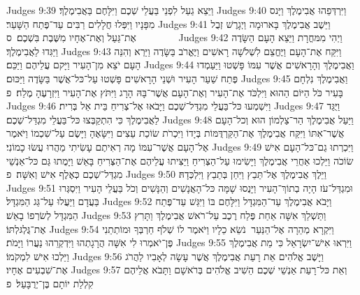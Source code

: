 Judges 9:39	וַיֵּצֵא גַעַל לִפְנֵי בַּעֲלֵי שְׁכֶם וַיִּלָּחֶם בַּאֲבִימֶלֶךְ׃
Judges 9:40	וַיִּרְדְּפֵהוּ אֲבִימֶלֶךְ וַיָּנס מִפָּנָיו וַיִּפְּלוּ חֲלָלִים רַבִּים עַד־פֶּתַח הַשָּׁעַר׃
Judges 9:41	וַיֵּשֶׁב אֲבִימֶלֶךְ בָּארוּמָה וַיְגָרֶשׁ זְבֻל אֶת־גַּעַל וְאֶת־אֶחָיו מִשֶּׁבֶת בִּשְׁכֶם׃ {ס}        
Judges 9:42	וַיְהִי מִמּחֳרָת וַיֵּצֵא הָעָם הַשָּׂדֶה וַיַּגִּדוּ לַאֲבִימֶלֶךְ׃
Judges 9:43	וַיִּקַּח אֶת־הָעָם וַיֶּחֱצֵם לִשְׁלֹשָׁה רָאשִׁים וַיֶּאֱרֹב בַּשָּׂדֶה וַיַּרְא וְהִנֵּה הָעָם יֹצֵא מִן־הָעִיר וַיָּקם עֲלֵיהֶם וַיַּכֵּם׃
Judges 9:44	וַאֲבִימֶלֶךְ וְהָרָאשִׁים אֲשֶׁר עִמּוֹ פָּשְׁטוּ וַיַּעַמְדוּ פֶּתַח שַׁעַר הָעִיר וּשְׁנֵי הָרָאשִׁים פָּשְׁטוּ עַל־כּל־אֲשֶׁר בַּשָּׂדֶה וַיַּכּוּם׃
Judges 9:45	וַאֲבִימֶלֶךְ נִלְחָם בָּעִיר כֹּל הַיּוֹם הַהוּא וַיִּלְכֹּד אֶת־הָעִיר וְאֶת־הָעָם אֲשֶׁר־בָּהּ הָרָג וַיִּתֹּץ אֶת־הָעִיר וַיִּזְרָעֶהָ מֶלַח׃ {פ}
Judges 9:46	וַיִּשְׁמְעוּ כּל־בַּעֲלֵי מִגְדַּל־שְׁכֶם וַיָּבֹאוּ אֶל־צְרִיחַ בֵּית אֵל בְּרִית׃
Judges 9:47	וַיֻּגַּד לַאֲבִימֶלֶךְ כִּי הִתְקַבְּצוּ כּל־בַּעֲלֵי מִגְדַּל־שְׁכֶם׃
Judges 9:48	וַיַּעַל אֲבִימֶלֶךְ הַר־צַלְמוֹן הוּא וְכל־הָעָם אֲשֶׁר־אִתּוֹ וַיִּקַּח אֲבִימֶלֶךְ אֶת־הַקַּרְדֻּמּוֹת בְּיָדוֹ וַיִּכְרֹת שׂוֹכַת עֵצִים וַיִּשָּׂאֶהָ וַיָּשֶׂם עַל־שִׁכְמוֹ וַיֹּאמֶר אֶל־הָעָם אֲשֶׁר־עִמּוֹ מָה רְאִיתֶם עָשִׂיתִי מַהֲרוּ עֲשׂוּ כָמוֹנִי׃
Judges 9:49	וַיִּכְרְתוּ גַם־כּל־הָעָם אִישׁ שׂוֹכֹה וַיֵּלְכוּ אַחֲרֵי אֲבִימֶלֶךְ וַיָּשִׂימוּ עַל־הַצְּרִיחַ וַיַּצִּיתוּ עֲלֵיהֶם אֶת־הַצְּרִיחַ בָּאֵשׁ וַיָּמֻתוּ גַּם כּל־אַנְשֵׁי מִגְדַּל־שְׁכֶם כְּאֶלֶף אִישׁ וְאִשָּׁה׃ {פ}
Judges 9:50	וַיֵּלֶךְ אֲבִימֶלֶךְ אֶל־תֵּבֵץ וַיִּחַן בְּתֵבֵץ וַיִּלְכְּדָהּ׃
Judges 9:51	וּמִגְדַּל־עֹז הָיָה בְתוֹךְ־הָעִיר וַיָּנֻסוּ שָׁמָּה כּל־הָאֲנָשִׁים וְהַנָּשִׁים וְכֹל בַּעֲלֵי הָעִיר וַיִּסְגְּרוּ בַּעֲדָם וַיַּעֲלוּ עַל־גַּג הַמִּגְדָּל׃
Judges 9:52	וַיָּבֹא אֲבִימֶלֶךְ עַד־הַמִּגְדָּל וַיִּלָּחֶם בּוֹ וַיִּגַּשׁ עַד־פֶּתַח הַמִּגְדָּל לְשׂרְפוֹ בָאֵשׁ׃
Judges 9:53	וַתַּשְׁלֵךְ אִשָּׁה אַחַת פֶּלַח רֶכֶב עַל־רֹאשׁ אֲבִימֶלֶךְ וַתָּרִץ אֶת־גֻּלְגּלְתּוֹ׃
Judges 9:54	וַיִּקְרָא מְהֵרָה אֶל־הַנַּעַר  נֹשֵׂא כֵלָיו וַיֹּאמֶר לוֹ שְׁלֹף חַרְבְּךָ וּמוֹתְתֵנִי פֶּן־יֹאמְרוּ לִי אִשָּׁה הֲרָגָתְהוּ וַיִּדְקְרֵהוּ נַעֲרוֹ וַיָּמֹת׃
Judges 9:55	וַיִּרְאוּ אִישׁ־יִשְׂרָאֵל כִּי מֵת אֲבִימֶלֶךְ וַיֵּלְכוּ אִישׁ לִמְקֹמוֹ׃
Judges 9:56	וַיָּשֶׁב אֱלֹהִים אֵת רָעַת אֲבִימֶלֶךְ אֲשֶׁר עָשָׂה לְאָבִיו לַהֲרֹג אֶת־שִׁבְעִים אֶחָיו׃
Judges 9:57	וְאֵת כּל־רָעַת אַנְשֵׁי שְׁכֶם הֵשִׁיב אֱלֹהִים בְּרֹאשָׁם וַתָּבֹא אֲלֵיהֶם קִלְלַת יוֹתָם בֶּן־יְרֻבָּעַל׃ {פ}
